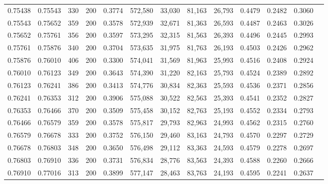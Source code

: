 \begin{tabular}{rrrrrrrrrrrrr}
0.75438 & 0.75543 &    330 & 200 &                                     0.3774 & 572,580 &  33,030 &  81,163 &  26,793 & 0.4479 & 0.2482 & 0.3060 \\
0.75543 & 0.75652 &    359 & 200 &                                     0.3578 & 572,939 &  32,671 &  81,363 &  26,593 & 0.4487 & 0.2463 & 0.3026 \\
0.75652 & 0.75761 &    356 & 200 &                                     0.3597 & 573,295 &  32,315 &  81,563 &  26,393 & 0.4496 & 0.2445 & 0.2993 \\
0.75761 & 0.75876 &    340 & 200 &                                     0.3704 & 573,635 &  31,975 &  81,763 &  26,193 & 0.4503 & 0.2426 & 0.2962 \\
0.75876 & 0.76010 &    406 & 200 &                                     0.3300 & 574,041 &  31,569 &  81,963 &  25,993 & 0.4516 & 0.2408 & 0.2924 \\
0.76010 & 0.76123 &    349 & 200 &                                     0.3643 & 574,390 &  31,220 &  82,163 &  25,793 & 0.4524 & 0.2389 & 0.2892 \\
0.76123 & 0.76241 &    386 & 200 &                                     0.3413 & 574,776 &  30,834 &  82,363 &  25,593 & 0.4536 & 0.2371 & 0.2856 \\
0.76241 & 0.76353 &    312 & 200 &                                     0.3906 & 575,088 &  30,522 &  82,563 &  25,393 & 0.4541 & 0.2352 & 0.2827 \\
0.76353 & 0.76466 &    370 & 200 &                                     0.3509 & 575,458 &  30,152 &  82,763 &  25,193 & 0.4552 & 0.2334 & 0.2793 \\
0.76466 & 0.76579 &    359 & 200 &                                     0.3578 & 575,817 &  29,793 &  82,963 &  24,993 & 0.4562 & 0.2315 & 0.2760 \\
0.76579 & 0.76678 &    333 & 200 &                                     0.3752 & 576,150 &  29,460 &  83,163 &  24,793 & 0.4570 & 0.2297 & 0.2729 \\
0.76678 & 0.76803 &    348 & 200 &                                     0.3650 & 576,498 &  29,112 &  83,363 &  24,593 & 0.4579 & 0.2278 & 0.2697 \\
0.76803 & 0.76910 &    336 & 200 &                                     0.3731 & 576,834 &  28,776 &  83,563 &  24,393 & 0.4588 & 0.2260 & 0.2666 \\
0.76910 & 0.77016 &    313 & 200 &                                     0.3899 & 577,147 &  28,463 &  83,763 &  24,193 & 0.4595 & 0.2241 & 0.2637 \\

\end{tabular}
